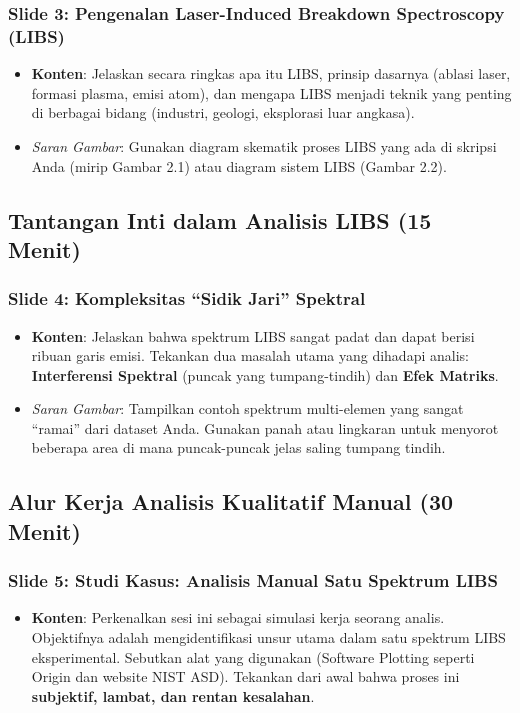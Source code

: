 \documentclass[12pt, a4paper]{article}
\begin{document}
\subsubsection*{Slide 3: Pengenalan Laser-Induced Breakdown Spectroscopy (LIBS)}
\begin{itemize}
    \item \textbf{Konten}: Jelaskan secara ringkas apa itu LIBS, prinsip dasarnya (ablasi laser, formasi plasma, emisi atom), dan mengapa LIBS menjadi teknik yang penting di berbagai bidang (industri, geologi, eksplorasi luar angkasa).
    \item \textit{Saran Gambar}: Gunakan diagram skematik proses LIBS yang ada di skripsi Anda (mirip Gambar 2.1) atau diagram sistem LIBS (Gambar 2.2).
\end{itemize}

\subsection{Tantangan Inti dalam Analisis LIBS (15 Menit)}

\subsubsection*{Slide 4: Kompleksitas ``Sidik Jari'' Spektral}
\begin{itemize}
    \item \textbf{Konten}: Jelaskan bahwa spektrum LIBS sangat padat dan dapat berisi ribuan garis emisi. Tekankan dua masalah utama yang dihadapi analis: \textbf{Interferensi Spektral} (puncak yang tumpang-tindih) dan \textbf{Efek Matriks}.
    \item \textit{Saran Gambar}: Tampilkan contoh spektrum multi-elemen yang sangat ``ramai'' dari dataset Anda. Gunakan panah atau lingkaran untuk menyorot beberapa area di mana puncak-puncak jelas saling tumpang tindih.
\end{itemize}

\subsection{Alur Kerja Analisis Kualitatif Manual (30 Menit)}

\subsubsection*{Slide 5: Studi Kasus: Analisis Manual Satu Spektrum LIBS}
\begin{itemize}
    \item \textbf{Konten}: Perkenalkan sesi ini sebagai simulasi kerja seorang analis. Objektifnya adalah mengidentifikasi unsur utama dalam satu spektrum LIBS eksperimental. Sebutkan alat yang digunakan (Software Plotting seperti Origin dan website NIST ASD). Tekankan dari awal bahwa proses ini \textbf{subjektif, lambat, dan rentan kesalahan}.
\end{itemize}
\end{document}
